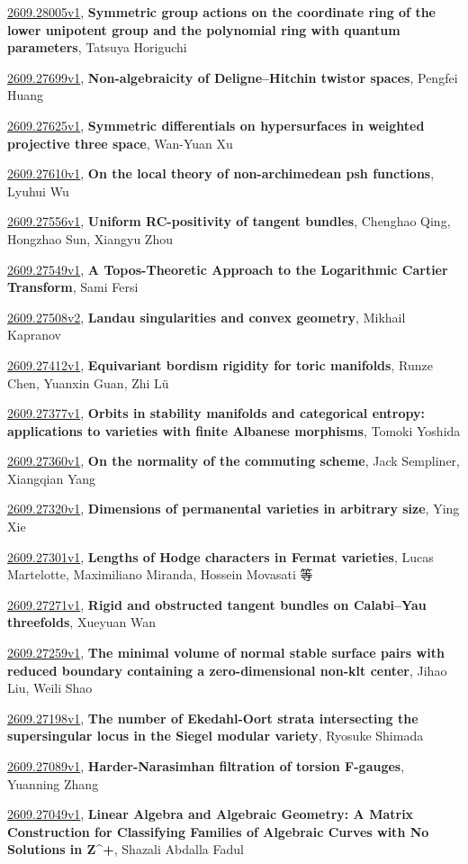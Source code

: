 \documentclass[9pt, a4paper]{article}
\theoremstyle{plain}
\theoremstyle{definition}
\theoremstyle{remark}
\newcommand{\arxiv}[3]{\href{https://arxiv.org/abs/#1}{#1}, \textbf{\textcolor{arxivblue}{#2}}, #3}
\begin{document}
\arxiv{2609.28005v1}{Symmetric group actions on the coordinate ring of the lower unipotent group and the polynomial ring with quantum parameters}{Tatsuya Horiguchi}

\arxiv{2609.27699v1}{Non-algebraicity of Deligne--Hitchin twistor spaces}{Pengfei Huang}

\arxiv{2609.27625v1}{Symmetric differentials on hypersurfaces in weighted projective three space}{Wan-Yuan Xu}

\arxiv{2609.27610v1}{On the local theory of non-archimedean psh functions}{Lyuhui Wu}

\arxiv{2609.27556v1}{Uniform RC-positivity of tangent bundles}{Chenghao Qing, Hongzhao Sun, Xiangyu Zhou}

\arxiv{2609.27549v1}{A Topos-Theoretic Approach to the Logarithmic Cartier Transform}{Sami Fersi}

\arxiv{2609.27508v2}{Landau singularities and convex geometry}{Mikhail Kapranov}

\arxiv{2609.27412v1}{Equivariant bordism rigidity for toric manifolds}{Runze Chen, Yuanxin Guan, Zhi Lü}

\arxiv{2609.27377v1}{Orbits in stability manifolds and categorical entropy: applications to varieties with finite Albanese morphisms}{Tomoki Yoshida}

\arxiv{2609.27360v1}{On the normality of the commuting scheme}{Jack Sempliner, Xiangqian Yang}

\arxiv{2609.27320v1}{Dimensions of permanental varieties in arbitrary size}{Ying Xie}

\arxiv{2609.27301v1}{Lengths of Hodge characters in Fermat varieties}{Lucas Martelotte, Maximiliano Miranda, Hossein Movasati 等}

\arxiv{2609.27271v1}{Rigid and obstructed tangent bundles on Calabi--Yau threefolds}{Xueyuan Wan}

\arxiv{2609.27259v1}{The minimal volume of normal stable surface pairs with reduced boundary containing a zero-dimensional non-klt center}{Jihao Liu, Weili Shao}

\arxiv{2609.27198v1}{The number of Ekedahl-Oort strata intersecting the supersingular locus in the Siegel modular variety}{Ryosuke Shimada}

\arxiv{2609.27089v1}{Harder-Narasimhan filtration of torsion F-gauges}{Yuanning Zhang}

\arxiv{2609.27049v1}{Linear Algebra and Algebraic Geometry: A Matrix Construction for Classifying Families of Algebraic Curves with No Solutions in Z^+}{Shazali Abdalla Fadul}
\end{document}

